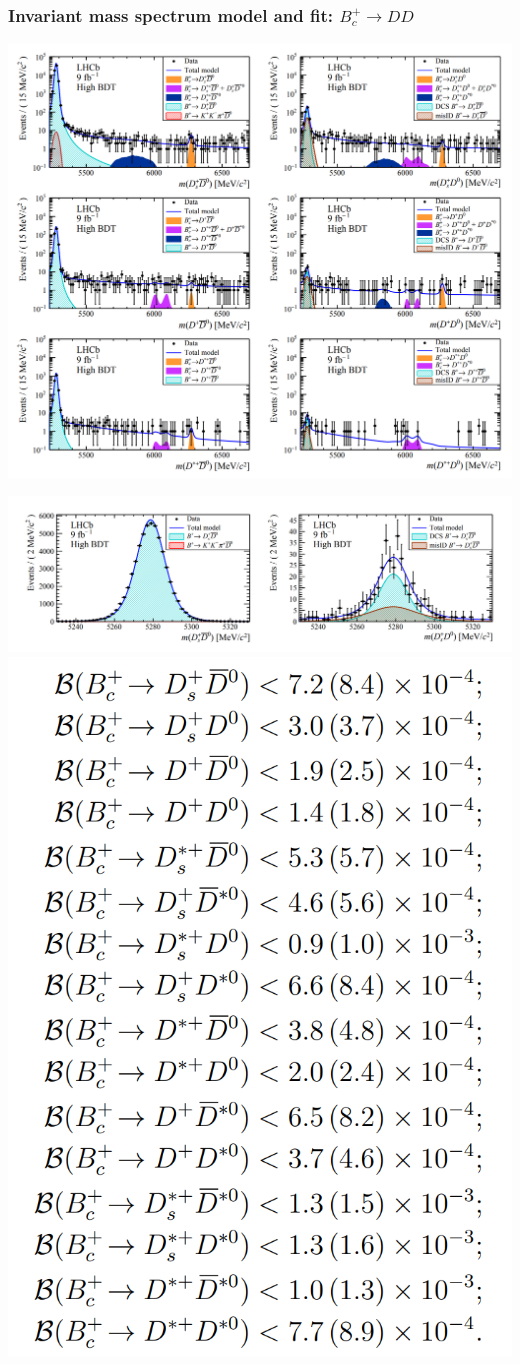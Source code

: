 \documentclass[10pt, aspectratio=169]{beamer}
\begin{document}
\begin{frame}[label=Bc2DD-fit]%
  \frametitle{Invariant mass spectrum model and fit: $B_c^+\to DD$}
  \centering
  \parbox{.54\linewidth}{
    \includegraphics[width=\linewidth]{figures/lect/Bc2DD-fit-all}
  }
  \parbox{.45\linewidth}{
    \centering
    \includegraphics[width=\linewidth]{figures/lect/Bc2DD-fit-lower}
    \includegraphics[width=.5\linewidth]{figures/lect/Bc2DD-results}
  }
\end{frame}%
\end{document}

